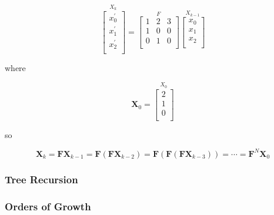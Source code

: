 \begin{equation}
\stackrel{\mbox{$X_k$}}{
\left[ \begin{array}{c}
x^{'}_{0} \\
x^{'}_{1} \\
x^{'}_{2} \\
\end{array} \right]
}
= 
\stackrel{\mbox{$F$}}{
\left[ \begin{array}{ccc}
1 & 2 & 3 \\
1 & 0 & 0 \\
0 & 1 & 0 \\
\end{array} \right]
}
\stackrel{\mbox{$X_{k-1}$}}{
\left[ \begin{array}{c}
x_{0} \\
x_{1} \\
x_{2} \\
\end{array} \right]
}
\label{eq:ss_rep_2}
\end{equation}

where

\begin{equation}
\mathbf{X}_0 = 
\stackrel{\mbox{$X_{0}$}}{
\left[ \begin{array}{c}
2 \\
1 \\
0 \\
\end{array} \right]
}
\label{eq:ss_x0}
\end{equation}

so

\begin{equation}
\mathbf{X}_k 
= \mathbf{F}\mathbf{X}_{k-1}
= \mathbf{F} \left( \mathbf{F}\mathbf{X}_{k-2} \right)
= \mathbf{F} \left( \mathbf{F} \left( \mathbf{F}\mathbf{X}_{k-3} \right) \right)
= \cdots
= \mathbf{F}^N \mathbf{X}_0
\label{eq:ss_rep_expanded}
\end{equation}

            \subsubsection{Tree Recursion}
            \subsubsection{Orders of Growth}
